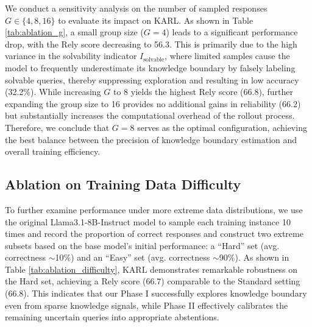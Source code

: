 \documentclass{article} %
\newcommand{\framename}{\textsc{KARL}}
\begin{document}
We conduct a sensitivity analysis on the number of sampled responses $G \in \{4, 8, 16\}$ to evaluate its impact on \framename{}. As shown in Table \ref{tab:ablation_g}, a small group size ($G=4$) leads to a significant performance drop, with the Rely score decreasing to 56.3. This is primarily due to the high variance in the solvability indicator $I_{\text{solvable}}$, where limited samples cause the model to frequently underestimate its knowledge boundary by falsely labeling solvable queries, thereby suppressing exploration and resulting in low accuracy (32.2\%). While increasing $G$ to 8 yields the highest Rely score (66.8), further expanding the group size to 16 provides no additional gains in reliability (66.2) but substantially increases the computational overhead of the rollout process. Therefore, we conclude that $G=8$ serves as the optimal configuration, achieving the best balance between the precision of knowledge boundary estimation and overall training efficiency.


\subsection{Ablation on Training Data Difficulty}
\label{app: ablation on Data Difficulty}
To further examine performance under more extreme data distributions, we use the original Llama3.1-8B-Instruct model to sample each training instance 10 times and record the proportion of correct responses and construct two extreme subsets based on the base model's initial performance: a ``Hard'' set (avg. correctness $\sim$10\%) and an ``Easy'' set (avg. correctness $\sim$90\%). As shown in Table \ref{tab:ablation_difficulty}, KARL demonstrates remarkable robustness on the Hard set, achieving a Rely score (66.7) comparable to the Standard setting (66.8). This indicates that our Phase I successfully explores knowledge boundary even from sparse knowledge signals, while Phase II effectively calibrates the remaining uncertain queries into appropriate abstentions. 


\end{document}
